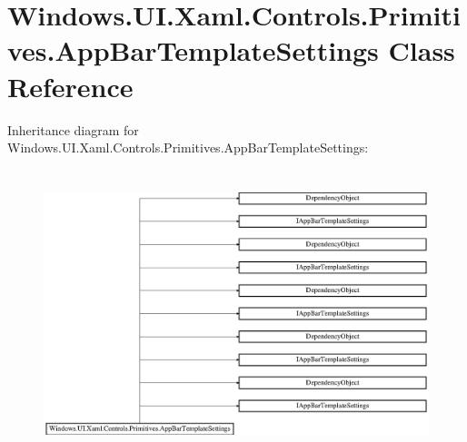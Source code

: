 \hypertarget{class_windows_1_1_u_i_1_1_xaml_1_1_controls_1_1_primitives_1_1_app_bar_template_settings}{}\section{Windows.\+U\+I.\+Xaml.\+Controls.\+Primitives.\+App\+Bar\+Template\+Settings Class Reference}
\label{class_windows_1_1_u_i_1_1_xaml_1_1_controls_1_1_primitives_1_1_app_bar_template_settings}
Inheritance diagram for Windows.\+U\+I.\+Xaml.\+Controls.\+Primitives.\+App\+Bar\+Template\+Settings\+:\begin{figure}[H]
\begin{center}
\leavevmode
\includegraphics[height=8.392370cm]{class_windows_1_1_u_i_1_1_xaml_1_1_controls_1_1_primitives_1_1_app_bar_template_settings}
\end{center}
\end{figure}
